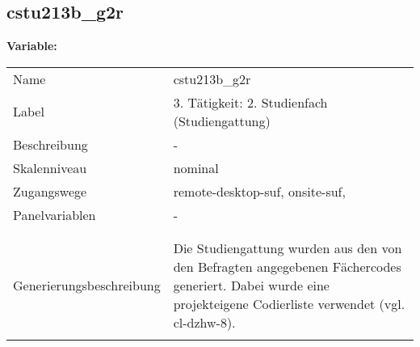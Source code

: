 	
	
	\subsection{cstu213b\_g2r}
	\label{subSection:cstu213b_g2r}

	\noindent\textbf{Variable:}\\
		\begin{tabular}{lL{11.3cm}}
			\label{tableVariable:cstu213b_g2r}
			Name & cstu213b\_g2r \\
			Label & 3. Tätigkeit: 2. Studienfach (Studiengattung) \\
			Beschreibung & - \\
			Skalenniveau & nominal \\
			Zugangswege &
				remote-desktop-suf,
				onsite-suf,
 \\
			Panelvariablen & -
			 \\
			 \\
 \\
					Generierungsbeschreibung & Die Studiengattung wurden aus den von den Befragten angegebenen Fächercodes generiert.  Dabei wurde eine projekteigene Codierliste verwendet (vgl. cl-dzhw-8).
				 \\	
			 \\
		\end{tabular}







